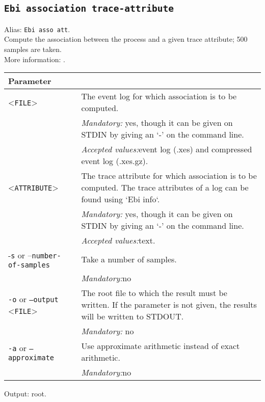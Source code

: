 {\subsection{\texttt{Ebi association trace-attribute}}
\label{command:Ebi association trace-attribute}
Alias: \texttt{Ebi asso att}.\\
Compute the association between the process and a given trace attribute; 500 samples are taken.\\
More information: \cite{DBLP:journals/tkde/LeemansMPH23}.\\
\begin{tabularx}{\linewidth}{lX}
\toprule
Parameter \\\midrule
<\texttt{FILE}>&The event log for which association is to be computed.\\
&\textit{Mandatory:} \quad yes, though it can be given on STDIN by giving an `-' on the command line.\\
&\textit{Accepted values:}\quad event log (.xes) and compressed event log (.xes.gz).\\
<\texttt{ATTRIBUTE}>&The trace attribute for which association is to be computed. The trace attributes of a log can be found using `Ebi info`.\\
&\textit{Mandatory:} \quad yes, though it can be given on STDIN by giving an `-' on the command line.\\
&\textit{Accepted values:}\quad text.\\
-\texttt{s} or --\texttt{number-of-samples}
&Take a number of samples.\\
&\textit{Mandatory:}\quad no\\
\texttt{-o} or \texttt{--output} <\texttt{FILE}> &
The root file to which the result must be written. If the parameter is not given, the results will be written to STDOUT.\\
&\textit{Mandatory:} \quad no\\
\texttt{-a} or \texttt{--approximate} & Use approximate arithmetic instead of exact arithmetic.\\
&\textit{Mandatory:}\quad no\\
\bottomrule
\end{tabularx}
Output: root.
}
